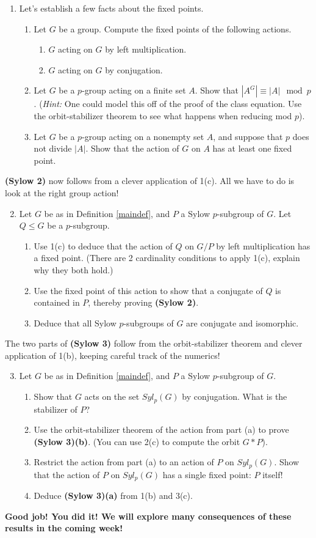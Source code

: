 \documentclass[11pt]{article}
\begin{document}
\begin{enumerate}
\item Let's establish a few facts about the fixed points.
\begin{enumerate}
\item Let $G$ be a group.  Compute the fixed points of the following actions.
\begin{enumerate}
\item $G$ acting on $G$ by left multiplication.
\item $G$ acting on $G$ by conjugation.
\end{enumerate}
\item Let $G$ be a $p$-group acting on a finite set $A$.  Show that $|A^G|\equiv |A|\mod p$.  (\textit{Hint:} One could model this off of the proof of the class equation.  Use the orbit-stabilizer theorem to see what happens when reducing mod $p$).
\item Let $G$ be a $p$-group acting on a nonempty set $A$, and suppose that $p$ does not divide $|A|$.  Show that the action of $G$ on $A$ has at least one fixed point.
\end{enumerate}
\end{enumerate}
\textbf{(Sylow 2)} now follows from a clever application of 1(c).  All we have to do is look at the right group action!
\begin{enumerate}
\setcounter{enumi}{1}
\item Let $G$ be as in Definition \ref{maindef}, and $P$ a Sylow $p$-subgroup of $G$.  Let $Q\le G$ be a $p$-subgroup.
\begin{enumerate}
\item Use 1(c) to deduce that the action of $Q$ on $G/P$ by left multiplication has a fixed point.  (There are 2 cardinality conditions to apply 1(c), explain why they both hold.)
\item Use the fixed point of this action to show that a conjugate of $Q$ is contained in $P$, thereby proving \textbf{(Sylow 2)}.
\item Deduce that all Sylow $p$-subgroups of $G$ are conjugate and isomorphic.
\end{enumerate}
\end{enumerate}
The two parts of \textbf{(Sylow 3)} follow from the orbit-stabilizer theorem and clever application of 1(b), keeping careful track of the numerics!
\begin{enumerate}
\setcounter{enumi}{2}
\item Let $G$ be as in Definition \ref{maindef}, and $P$ a Sylow $p$-subgroup of $G$.
\begin{enumerate}
\item Show that $G$ acts on the set $Syl_p(G)$ by conjugation.  What is the stabilizer of $P$?
\item Use the orbit-stabilizer theorem of the action from part (a) to prove \textbf{(Sylow 3)(b)}.  (You can use 2(c) to compute the orbit $G*P$).
\item Restrict the action from part (a) to an action of $P$ on $Syl_p(G)$.  Show that the action of $P$ on $Syl_p(G)$ has a single fixed point: $P$ itself!
\item Deduce \textbf{(Sylow 3)(a)} from 1(b) and 3(c).
\end{enumerate}
\end{enumerate}
\textbf{Good job!  You did it!  We will explore many consequences of these results in the coming week!}
\end{document}
